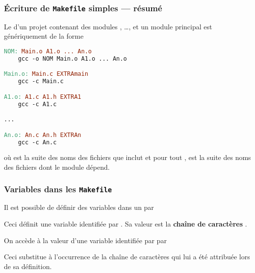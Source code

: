 \begin{frame}[fragile]
\frametitle{Écriture de {\tt Makefile} simples --- résumé}
Le  d'un projet contenant des modules , \dots,
 et un module principal  est génériquement de la
forme
\begin{lstlisting}[language=make]
NOM: Main.o A1.o ... An.o
    gcc -o NOM Main.o A1.o ... An.o

Main.o: Main.c EXTRAmain
    gcc -c Main.c

A1.o: A1.c A1.h EXTRA1
    gcc -c A1.c

...

An.o: An.c An.h EXTRAn
    gcc -c An.c
\end{lstlisting}
où  est la suite des noms des fichiers  que
 inclut et pour tout , 
est la suite des noms des fichiers  dont le module  dépend.
\end{frame}

\begin{frame}[fragile]
\frametitle{Variables dans les {\tt Makefile}}
Il est possible de \alert{définir des variables} dans un 
par
\begin{center}\end{center}
Ceci définit une variable identifiée par . Sa valeur est
la {\bf chaîne de caractères} .
\bigskip

On accède à la valeur d'une variable identifiée par  par
\begin{center}\end{center}
Ceci substitue à l'occurrence de  la chaîne de caractères qui
lui a été attribuée lors de sa définition.
\end{frame}


